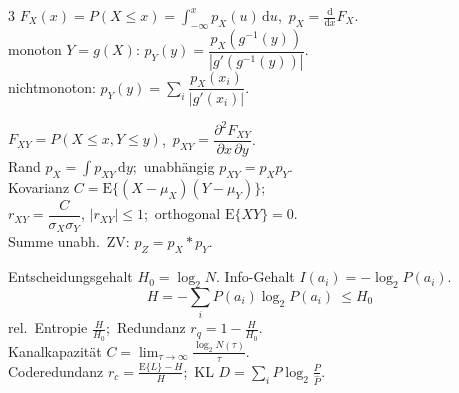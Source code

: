 \begin{multicols}{3}
$F_X(x)=P(X\le x)=\int_{-\infty}^{x} p_X(u)\,\mathrm du$,\ $p_X=\tfrac{\mathrm d}{\mathrm dx}F_X$.\\
monoton $Y=g(X)$: $p_Y(y)=\dfrac{p_X(g^{-1}(y))}{|g'(g^{-1}(y))|}$.\\
nichtmonoton: $p_Y(y)=\sum_i \dfrac{p_X(x_i)}{|g'(x_i)|}$.

$F_{XY}=P(X\le x,Y\le y)$,\ $p_{XY}=\dfrac{\partial^2 F_{XY}}{\partial x\,\partial y}$.\\
Rand $p_X=\int p_{XY}\,\mathrm dy$;\ unabhängig $p_{XY}=p_X p_Y$.\\
Kovarianz $C=\mathrm E\{(X-\mu_X)(Y-\mu_Y)\}$;\\
$r_{XY}=\dfrac{C}{\sigma_X\sigma_Y}$, $|r_{XY}|\le1$;\ orthogonal $\mathrm E\{XY\}=0$.\\
Summe unabh.\ ZV: $p_Z=p_X*p_Y$.

Entscheidungsgehalt $H_0=\log_2 N$.\quad
Info-Gehalt $I(a_i)=-\log_2 P(a_i)$.
\[ H=-\sum_{i} P(a_i)\log_2 P(a_i)\ \le H_0 \]
rel.\ Entropie $\tfrac{H}{H_0}$;\ Redundanz $r_q=1-\tfrac{H}{H_0}$.\\
Kanalkapazität $C=\lim_{\tau\to\infty}\tfrac{\log_2 N(\tau)}{\tau}$.\\
Coderedundanz $r_c=\tfrac{\mathrm E\{L\}-H}{H}$;\
KL $D=\sum_i P\log_2\tfrac{P}{\widehat P}$.

\end{multicols}

\restoregeometry

